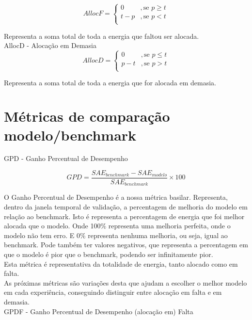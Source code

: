 \begin{equation} \label{eq:allocf} 
    AllocF = 
    \begin{cases} 
        0 & , \text{se } p \geq t \\
        t - p  & , \text{se } p < t \\
    \end{cases} 
\end{equation}
\smallskip

Representa a soma total de toda a energia que faltou ser alocada. \\
\bigskip
AllocD - Alocação em Demasia \\

\begin{equation} \label{eq:allocd} 
    AllocD = 
    \begin{cases} 
        0 & , \text{se } p \leq t \\
        p - t  & , \text{se } p > t \\
    \end{cases} 
\end{equation}
\smallskip

Representa a soma total de toda a energia que for alocada em demasia. \\

\section{Métricas de comparação modelo/benchmark}

GPD - Ganho Percentual de Desempenho

\begin{equation} \label{eq:gpd} 
    GPD = \frac{SAE_{benchmark} - SAE_{modelo}}{SAE_{benchmark}} \times 100
\end{equation}
\smallskip

O Ganho Percentual de Desempenho é a nossa métrica basilar. Representa, dentro da janela temporal de validação, a percentagem de melhoria do modelo em relação ao benchmark. Isto é representa a percentagem de energia que foi melhor alocada que o modelo. Onde 100\% representa uma melhoria perfeita, onde o modelo não tem erro. E 0\% representa nenhuma melhoria, ou seja, igual ao benchmark. Pode também ter valores negativos, que representa a percentagem em que o modelo é pior que o benchmark, podendo ser infinitamente pior.\\
Esta métrica é representativa da totalidade de energia, tanto alocado como em falta. \\
As próximas métricas são variações desta que ajudam a escolher o melhor modelo em cada experiência, conseguindo distinguir entre alocação em falta e em demasia.\\
\bigskip
GPDF - Ganho Percentual de Desempenho (alocação em) Falta\\

